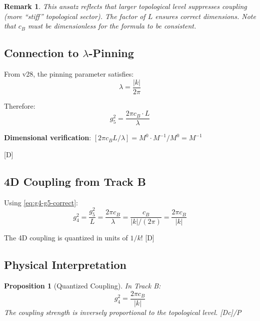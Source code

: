 \documentclass[11pt,a4paper]{article}
\newtheorem{proposition}[theorem]{Proposition}
\newtheorem{remark}[theorem]{Remark}
\newcommand{\tagD}{\textcolor{blue!70!black}{[D]}}
\newcommand{\tagDc}{\textcolor{blue!50!black}{[Dc]}}
\begin{document}
\begin{remark}
This ansatz reflects that larger topological level suppresses coupling (more
``stiff'' topological sector). The factor of $L$ ensures correct dimensions.
Note that $c_B$ must be dimensionless for the formula to be consistent.
\end{remark}

\subsection{Connection to $\lambda$-Pinning}

From v28, the pinning parameter satisfies:
\begin{equation}
\label{eq:lambda-k}
\lambda = \frac{|k|}{2\pi}
\end{equation}

Therefore:
\begin{equation}
\label{eq:track-b-lambda}
g_5^2 = \frac{2\pi c_B \cdot L}{\lambda}
\end{equation}

\textbf{Dimensional verification}: $[2\pi c_B L / \lambda] = M^0 \cdot M^{-1} / M^0 = M^{-1}$ \checkmark

\tagD

\subsection{4D Coupling from Track B}

Using \eqref{eq:g4-g5-correct}:
\begin{equation}
\label{eq:track-b-g4}
g_4^2 = \frac{g_5^2}{L} = \frac{2\pi c_B}{\lambda} = \frac{c_B}{|k|/(2\pi)} = \frac{2\pi c_B}{|k|}
\end{equation}

The 4D coupling is quantized in units of $1/k$! \tagD

\subsection{Physical Interpretation}

\begin{proposition}[Quantized Coupling]
\label{prop:quantized-g4}
In Track B:
\begin{equation}
\label{eq:g4-quantized}
\boxed{g_4^2 = \frac{2\pi c_B}{|k|}}
\end{equation}
The coupling strength is inversely proportional to the topological level. \tagDc/P
\end{proposition}
\end{document}
